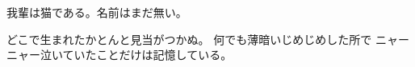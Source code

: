 \documentclass{jsarticle}
\begin{document}
我輩は猫である。名前はまだ無い。

どこで生まれたかとんと見当がつかぬ。
何でも薄暗いじめじめした所で
ニャーニャー泣いていたことだけは記憶している。
\end{document}
